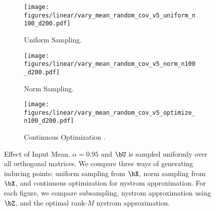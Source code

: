 \begin{figure}[!htb]
\centering
\begin{subfigure}[b]{\textwidth}
       \texttt{[image: figures/linear/vary\_mean\_random\_cov\_v5\_uniform\_n100\_d200.pdf]}
       \caption{Uniform Sampling.}
      \end{subfigure}
      \hspace{2em}
\begin{subfigure}[b]{\textwidth}
       \texttt{[image: figures/linear/vary\_mean\_random\_cov\_v5\_norm\_n100\_d200.pdf]}
       \caption{Norm Sampling.}
      \end{subfigure}
      \hspace{2em}
\begin{subfigure}[b]{\textwidth}
       \texttt{[image: figures/linear/vary\_mean\_random\_cov\_v5\_optimize\_n100\_d200.pdf]}
       \caption{Continuous Optimization .}
      \end{subfigure}
      \hspace{2em}
\caption{Effect of Input Mean. $\alpha=0.95$ and $\bU$ is sampled uniformly over all orthogonal matrices. We compare three ways of generating inducing points: uniform sampling from $\bX$, norm sampling from $\bX$, and continuous optimization for nystrom approximation. For each figure, we compare subsampling, nystrom approximation using $\bZ$, and the optimal rank-$M$ nystrom approximation.}
\end{figure}




